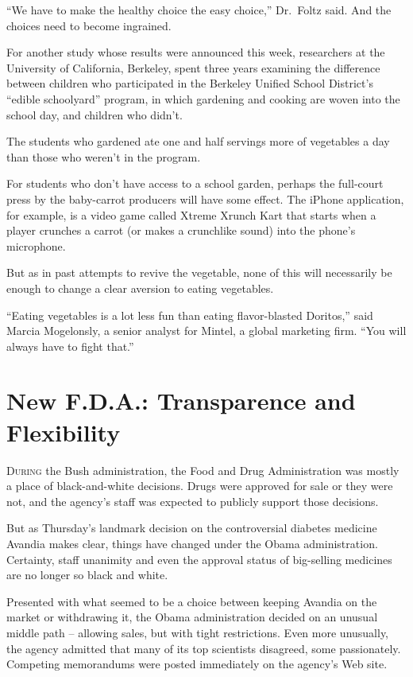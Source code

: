 ﻿\documentclass[12pt]{article}
\begin{document}
``We have to make the healthy choice the easy choice,'' Dr.~Foltz said. And the choices need to
become ingrained.

For another study whose results were announced this week, researchers at the University of
California, Berkeley, spent three years examining the difference between children who participated
in the Berkeley Unified School District's ``edible schoolyard'' program, in which gardening and
cooking are woven into the school day, and children who didn't.

The students who gardened ate one and half servings more of vegetables a day than those who weren't
in the program.

For students who don't have access to a school garden, perhaps the full-court press by the
baby-carrot producers will have some effect. The iPhone application, for example, is a video game
called Xtreme Xrunch Kart that starts when a player crunches a carrot (or makes a crunchlike sound)
into the phone's microphone.

But as in past attempts to revive the vegetable, none of this will necessarily be enough to change a
clear aversion to eating vegetables.

``Eating vegetables is a lot less fun than eating flavor-blasted Doritos,'' said Marcia Mogelonsly,
a senior analyst for Mintel, a global marketing firm. ``You will always have to fight that.''

\pagebreak
\section{New F.D.A.: Transparence and Flexibility}

\lettrine{D}{uring} the Bush administration, the Food and Drug
Administration was mostly a place of black-and-white decisions. Drugs were approved for sale or they
were not, and the agency's staff was expected to publicly support those decisions.

But as Thursday's landmark decision on the controversial diabetes medicine Avandia makes clear,
things have changed under the Obama administration. Certainty, staff unanimity and even the approval
status of big-selling medicines are no longer so black and white.

Presented with what seemed to be a choice between keeping Avandia on the market or withdrawing it,
the Obama administration decided on an unusual middle path -- allowing sales, but with tight
restrictions. Even more unusually, the agency admitted that many of its top scientists disagreed,
some passionately. Competing memorandums were posted immediately on the agency's Web site.
\end{document}
